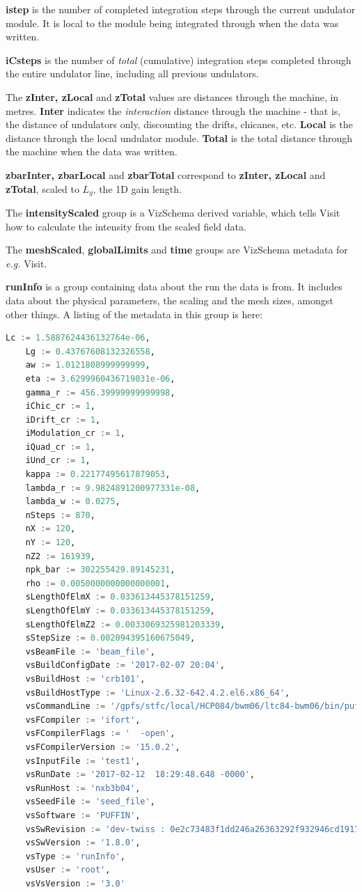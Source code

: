 \documentclass[12pt]{article}%
\begin{document}
{\bf istep} is the number of completed integration steps through the current undulator module. It is local to the module being integrated through when the data was written.

{\bf iCsteps} is the number of \textit{total} (cumulative) integration steps completed through the entire undulator line, including all previous undulators. 

The {\bf zInter, zLocal} and {\bf zTotal} values are distances through the machine, in metres. {\bf Inter} indicates the \textit{interaction} distance through the machine - that is, the distance of undulators only, discounting the drifts, chicanes, etc. {\bf Local} is the distance through the local undulator module. {\bf Total} is the total distance through the machine when the data was written.

{\bf zbarInter, zbarLocal} and {\bf zbarTotal} correspond to {\bf zInter, zLocal} and {\bf zTotal}, scaled to $L_g$, the 1D gain length.


The {\bf intensityScaled} group is a VizSchema derived variable, which tells Visit how to calculate the intensity from the scaled field data.

The {\bf meshScaled}, {\bf globalLimits} and {\bf time} groups are VizSchema metadata for \textit{e.g.} Visit. 

{\bf runInfo} is a group containing data about the run the data is from. It includes data about the physical parameters, the scaling and the mesh sizes, amongst other things. A listing of the metadata in this group is here:

\begin{lstlisting}[language=python]
    Lc := 1.5887624436132764e-06,
    Lg := 0.43767608132326558,
    aw := 1.0121808999999999,
    eta := 3.6299960436719031e-06,
    gamma_r := 456.39999999999998,
    iChic_cr := 1,
    iDrift_cr := 1,
    iModulation_cr := 1,
    iQuad_cr := 1,
    iUnd_cr := 1,
    kappa := 0.22177495617879053,
    lambda_r := 9.9824891200977331e-08,
    lambda_w := 0.0275,
    nSteps := 870,
    nX := 120,
    nY := 120,
    nZ2 := 161939,
    npk_bar := 302255429.89145231,
    rho := 0.0050000000000000001,
    sLengthOfElmX := 0.033613445378151259,
    sLengthOfElmY := 0.033613445378151259,
    sLengthOfElmZ2 := 0.0033069325981203339,
    sStepSize := 0.002094395160675049,
    vsBeamFile := 'beam_file',
    vsBuildConfigDate := '2017-02-07 20:04',
    vsBuildHost := 'crb101',
    vsBuildHostType := 'Linux-2.6.32-642.4.2.el6.x86_64',
    vsCommandLine := '/gpfs/stfc/local/HCP084/bwm06/ltc84-bwm06/bin/puffin-fftw3/bin/puffin test1.in',
    vsFCompiler := 'ifort',
    vsFCompilerFlags := '  -open',
    vsFCompilerVersion := '15.0.2',
    vsInputFile := 'test1',
    vsRunDate := '2017-02-12  18:29:48.648 -0000',
    vsRunHost := 'nxb3b04',
    vsSeedFile := 'seed_file',
    vsSoftware := 'PUFFIN',
    vsSwRevision := 'dev-twiss : 0e2c73483f1dd246a26363292f932946cd1917c8',
    vsSwVersion := '1.8.0',
    vsType := 'runInfo',
    vsUser := 'root',
    vsVsVersion := '3.0'
\end{lstlisting}
\end{document}
